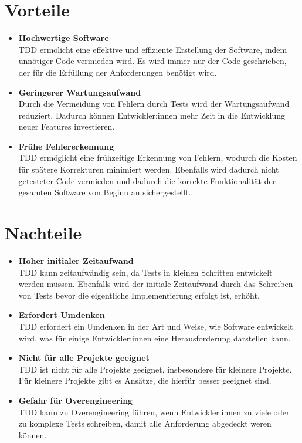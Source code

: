 \documentclass[a0,landscape]{a0poster}
\begin{document}
\begin{multicols}{4}
\section*{Vorteile}
\begin{itemize}
    \item \textbf{Hochwertige Software}\\
    TDD ermölicht eine effektive und effiziente Erstellung der Software, indem unnötiger Code vermieden wird. Es wird immer nur der Code geschrieben, der für die Erfüllung der Anforderungen benötigt wird.
    \item \textbf{Geringerer Wartungsaufwand}\\
    Durch die Vermeidung von Fehlern durch Tests wird der Wartungsaufwand reduziert. Dadurch können Entwickler:innen mehr Zeit in die Entwicklung neuer Features investieren.
    \item \textbf{Frühe Fehlererkennung}\\
    TDD ermöglicht eine frühzeitige Erkennung von Fehlern, wodurch die Kosten für spätere Korrekturen minimiert werden. Ebenfalls wird dadurch nicht getesteter Code vermieden und dadurch die korrekte Funktionalität der gesamten Software von Beginn an sichergestellt.
\end{itemize}

\section*{Nachteile}
\begin{itemize}
    \item \textbf{Hoher initialer Zeitaufwand}\\
    TDD kann zeitaufwändig sein, da Tests in kleinen Schritten entwickelt werden müssen. Ebenfalls wird der initiale Zeitaufwand durch das Schreiben von Tests bevor die eigentliche Implementierung erfolgt ist, erhöht.
    \item \textbf{Erfordert Umdenken}\\
    TDD erfordert ein Umdenken in der Art und Weise, wie Software entwickelt wird, was für einige Entwickler:innen eine Herausforderung darstellen kann.
    \item \textbf{Nicht für alle Projekte geeignet}\\
    TDD ist nicht für alle Projekte geeignet, insbesondere für kleinere Projekte. Für kleinere Projekte gibt es Ansätze, die hierfür besser geeignet sind.
    \item \textbf{Gefahr für Overengineering}\\
    TDD kann zu Overengineering führen, wenn Entwickler:innen zu viele oder zu komplexe Tests schreiben, damit alle Anforderung abgedeckt weren können.
\end{itemize}


\end{multicols}
\end{document}
